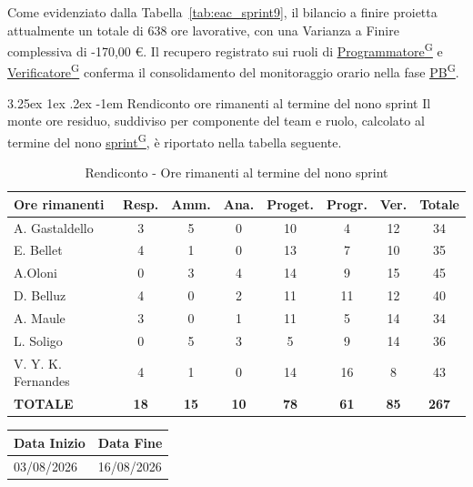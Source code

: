\documentclass[a4paper,12pt]{article}
\makeatletter
\newcounter{subsubsubsection}[subsubsection]
\renewcommand\paragraph{\@startsection{paragraph}{5}{\z@}%
  {3.25ex \@plus1ex \@minus.2ex}%
  {-1em}%
  {\normalfont\normalsize\bfseries}}
\providecommand{\glslink}[2]{\href{https://alittlebyte-19.github.io/Documentazione/glossario.html\#gls-#1}{\underline{#2}\textsuperscript{\scriptsize G}}}
\makeatother
\begin{document}
Come evidenziato dalla Tabella~\ref{tab:eac_sprint9}, il bilancio a finire proietta attualmente un totale di 638 ore lavorative, con una Varianza a Finire complessiva di -170,00 \euro. Il recupero registrato sui ruoli di \glslink{programmatore}{Programmatore} e \glslink{verificatore}{Verificatore} conferma il consolidamento del monitoraggio orario nella fase \glslink{pb-product-baseline}{PB}.


\paragraph{Rendiconto ore rimanenti al termine del nono sprint}
Il monte ore residuo, suddiviso per componente del team e ruolo, calcolato al termine del nono \glslink{sprint}{sprint}, è riportato nella tabella seguente.
\begin{table}[htbp]
\centering
\renewcommand{\arraystretch}{1.5}
\begin{tabularx}{\textwidth}{|X|c|c|c|c|c|c|c|}
\hline
\textbf{Ore rimanenti} & \textbf{Resp.} & \textbf{Amm.} & \textbf{Ana.} & \textbf{Proget.} & \textbf{Progr.} & \textbf{Ver.} & \textbf{Totale} \\
\hline
A. Gastaldello & 3 & 5 & 0 & 10 & 4 & 12 & 34 \\
\hline
E. Bellet & 4 & 1 & 0 & 13 & 7 & 10 & 35 \\
\hline
A.Oloni & 0 & 3 & 4 & 14 & 9 & 15 & 45 \\
\hline
D. Belluz & 4 & 0 & 2 & 11 & 11 & 12 & 40 \\
\hline
A. Maule & 3 & 0 & 1 & 11 & 5 & 14 & 34 \\
\hline
L. Soligo & 0 & 5 & 3 & 5 & 9 & 14 & 36 \\
\hline
V. Y. K. Fernandes & 4 & 1 & 0 & 14 & 16 & 8 & 43 \\
\hline
\rowcolor{gray!20}
\textbf{TOTALE} & \textbf{18} & \textbf{15} & \textbf{10} & \textbf{78} & \textbf{61} & \textbf{85} & \textbf{267} \\
\hline
\end{tabularx}
\caption{Rendiconto - Ore rimanenti al termine del nono sprint}
\end{table}


\newpage


\label{sec:pb_decimoperiodo}
\begin{table}[H]
    \centering
    \renewcommand{\arraystretch}{1.5}
    \begin{tabularx}{\textwidth}{|X|X|}
    \hline \rowcolor{Dandelion!50}
    \textbf{Data Inizio} & \textbf{Data Fine}\\
    \hline
    03/08/2026 & 16/08/2026\\
    \hline

    \end{tabularx}
\end{table}
\end{document}
